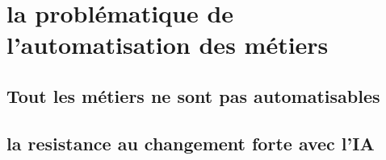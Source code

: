 \section{la problématique de l'automatisation des métiers}

\subsection{Tout les métiers ne sont pas automatisables}
\subsection{la resistance au changement forte avec l'IA}
